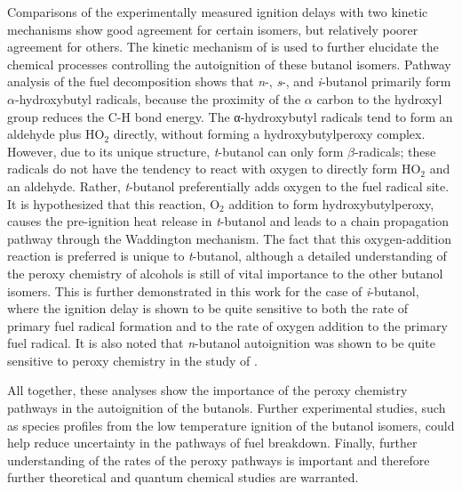 \documentclass[12pt, letterpaper]{article}
\begin{document}
Comparisons of the experimentally measured ignition delays with two kinetic
mechanisms show good agreement for certain isomers, but relatively poorer
agreement for others. The kinetic mechanism of \textcite{Sarathy2012} is used
to further elucidate the chemical processes controlling the autoignition of
these butanol isomers. Pathway analysis of the fuel decomposition shows that
\textit{n}-, \textit{s}-, and \textit{i}-butanol primarily form
$\alpha$-hydroxybutyl radicals, because the proximity of the $\alpha$ carbon to
the hydroxyl group reduces the C-H bond energy. The α-hydroxybutyl radicals
tend to form an aldehyde plus HO$_2$  directly, without forming a
hydroxybutylperoxy complex. However, due to its unique structure,
\textit{t}-butanol can only form $\beta$-radicals; these radicals do not have
the tendency to react with oxygen to directly form HO$_2$  and an aldehyde.
Rather, \textit{t}-butanol preferentially adds oxygen to the fuel radical site.
It is hypothesized that this reaction, O$_2$  addition to form
hydroxybutylperoxy, causes the pre-ignition heat release in \textit{t}-butanol
and leads to a chain propagation pathway through the Waddington mechanism. The
fact that this oxygen-addition reaction is preferred is unique to
\textit{t}-butanol, although a detailed understanding of the peroxy chemistry
of alcohols is still of vital importance to the other butanol isomers. This is
further demonstrated in this work for the case of \textit{i}-butanol, where the
ignition delay is shown to be quite sensitive to both the rate of primary fuel
radical formation and to the rate of oxygen addition to the primary fuel
radical. It is also noted that \textit{n}-butanol autoignition was shown to be
quite sensitive to peroxy chemistry in the study of \textcite{Vranckx2011}.

All together, these analyses show the importance of the peroxy chemistry
pathways in the autoignition of the butanols. Further experimental studies,
such as species profiles from the low temperature ignition of the butanol
isomers, could help reduce uncertainty in the pathways of fuel breakdown.
Finally, further understanding of the rates of the peroxy pathways is
important and therefore further theoretical and quantum chemical studies are
warranted.
\end{document}
